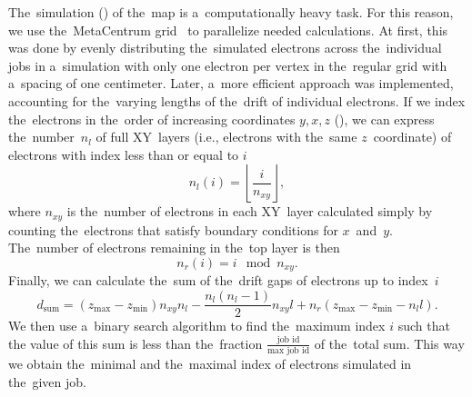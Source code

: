		The~simulation () of the~map is a~computationally heavy task. For this reason, we use the~MetaCentrum grid~\cite{metacentrum} to parallelize needed calculations. At first, this was done by evenly distributing the~simulated electrons across the~individual jobs in a~simulation with only one electron per vertex in the~regular grid with a~spacing of one centimeter. Later, a~more efficient approach was implemented, accounting for the~varying lengths of the~drift of individual electrons. If we index the~electrons in the~order of increasing coordinates $y,x,z$ (), we can express the~number~$n_l$ of full XY~layers (i.e., electrons with the~same $z$~coordinate) of electrons with index less than or equal to $i$
			\begin{equation}
				n_l(i) = \left\lfloor\frac{i}{n_{xy}}\right\rfloor,
			\end{equation}
		where $n_{xy}$ is the~number of electrons in each XY~layer calculated simply by counting the~electrons that satisfy boundary conditions for $x$~and~$y$.  The~number of electrons remaining in the~top layer is then
			\begin{equation}
				n_r(i) = i\!\!\!\!\mod n_{xy}.
			\end{equation}
		Finally, we can calculate the~sum of the~drift gaps of electrons up to index~$i$
			\begin{equation}
				d_\text{sum} = (z_\text{max}-z_\text{min})n_{xy}n_l-\frac{n_l(n_l-1)}{2}n_{xy}l+n_r(z_\text{max}-z_\text{min}-n_l l).
			\end{equation}
		We then use a~binary search algorithm to find the~maximum index $i$ such that the value of this sum is less than the~fraction $\frac{\text{job id}}{\text{max job id}}$ of the~total sum. This way we obtain the~minimal and the~maximal index of electrons simulated in the~given job.
		
		
